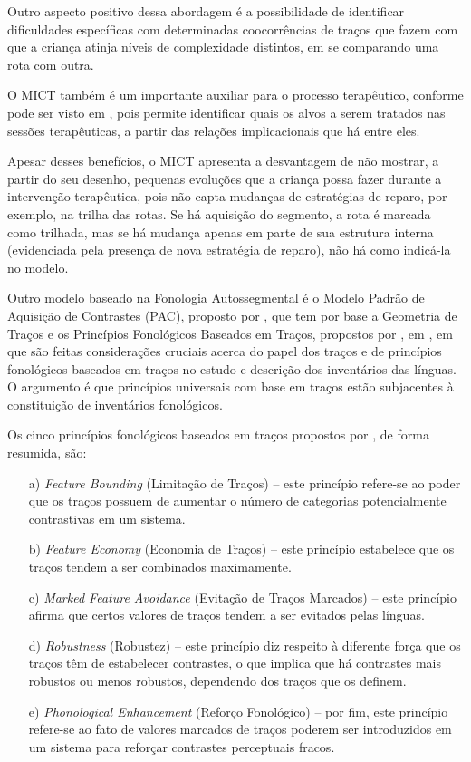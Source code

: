 \documentclass[output=paper,colorlinks,citecolor=brown,booklanguage=portuguese]{langscibook}
\begin{document}
Outro aspecto positivo dessa abordagem é a possibilidade de identificar dificuldades específicas com determinadas coocorrências de traços que fazem com que a criança atinja níveis de complexidade distintos, em se comparando uma rota com outra.

O MICT também é um importante auxiliar para o processo terapêutico, conforme pode ser visto em , pois permite identificar quais os alvos a serem tratados nas sessões terapêuticas, a partir das relações implicacionais que há entre eles. 

Apesar desses benefícios, o MICT apresenta a desvantagem de não mostrar, a partir do seu desenho, pequenas evoluções que a criança possa fazer durante a intervenção terapêutica, pois não capta mudanças de estratégias de reparo, por exemplo, na trilha das rotas. Se há aquisição do segmento, a rota é marcada como trilhada, mas se há mudança apenas em parte de sua estrutura interna (evidenciada pela presença de nova estratégia de reparo), não há como indicá-la no modelo.

Outro modelo baseado na Fonologia Autossegmental é o Modelo Padrão de Aquisição de Contrastes (PAC), proposto por \citet{LazzarottoVolcao2009}, que tem por base a Geometria de Traços e os Princípios Fonológicos Baseados em Traços, propostos por \citeauthor{Clements2009}, em \citeyear{Clements2009}, em que são feitas considerações cruciais acerca do papel dos traços e de princípios fonológicos baseados em traços no estudo e descrição dos inventários das línguas. O argumento é que princípios universais com base em traços estão subjacentes à constituição de inventários fonológicos.

Os cinco princípios fonológicos baseados em traços propostos por \citeauthor{Clements2009}, de forma resumida, são:

\begin{itemize}
    \item [a)] \emph{Feature Bounding} (Limitação de Traços) – este princípio refere-se ao poder que os traços possuem de aumentar o número de categorias potencialmente contrastivas em um sistema.
    \item[b)] \emph{Feature Economy} (Economia de Traços) – este princípio estabelece que os traços tendem a ser combinados maximamente.
    \item[c)] \emph{Marked Feature Avoidance} (Evitação de Traços Marcados) – este princípio afirma que certos valores de traços tendem a ser evitados pelas línguas.
    \item[d)] \emph{Robustness} (Robustez) – este princípio diz respeito à diferente força que os traços têm de estabelecer contrastes, o que implica que há contrastes mais robustos ou menos robustos, dependendo dos traços que os definem.
    \item[e)] \emph{Phonological Enhancement} (Reforço Fonológico) – por fim, este princípio refere-se ao fato de valores marcados de traços poderem ser introduzidos em um sistema para reforçar contrastes perceptuais fracos.
\end{itemize}
\end{document}
